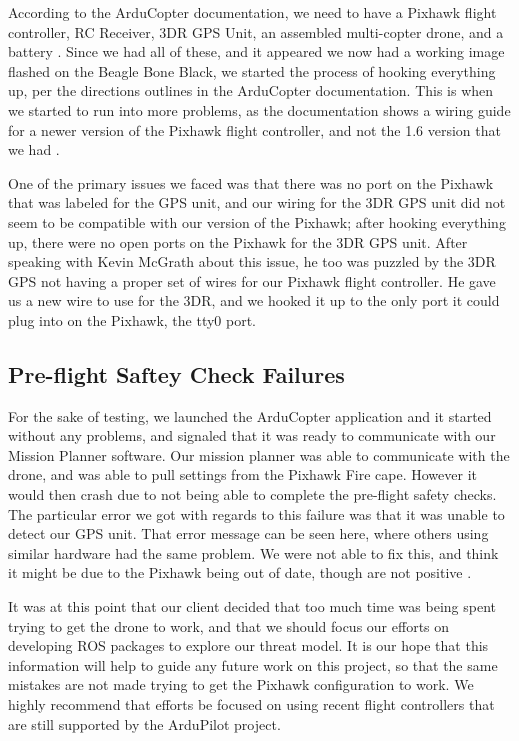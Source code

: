 \documentclass[IEEEtran,letterpaper,10pt,notitlepage,draftclsnofoot]{article}
\begin{document}
According to the ArduCopter documentation, we need to have a Pixhawk flight controller, RC Receiver, 3DR GPS
Unit, an assembled multi-copter drone, and a battery \cite{ArduCopterIntro}.
Since we had all of these, and it appeared we now had a working image flashed on the Beagle Bone Black, we
started the process of hooking everything up, per the directions outlines in
the ArduCopter documentation. This is when we started to run into more problems, as the documentation shows a
wiring guide for a newer version of the Pixhawk flight controller, and not the 1.6 version that we had
\cite{ArduPixhawkWiring}.

One of the primary issues we faced was that there was no port on the Pixhawk that was labeled for the GPS
unit, and our wiring for the 3DR GPS unit did not seem to be compatible with our version of the Pixhawk; after
hooking everything up, there were no open ports on the Pixhawk for the 3DR GPS unit.
After speaking with Kevin McGrath about this issue, he too was puzzled by the 3DR GPS not having a proper
set of wires for our Pixhawk flight controller. He gave us a new wire to use for the 3DR, and we hooked it
up to the only port it could plug into on the Pixhawk, the tty0 port.


\subsection{Pre-flight Saftey Check Failures}

For the sake of testing, we launched the ArduCopter application and it started without any problems, and
signaled that it was ready to communicate with our Mission Planner software. Our mission planner was able to
communicate with the drone, and was able to pull settings from the Pixhawk Fire cape. However it would then
crash due to not being able to complete the pre-flight safety checks. The particular error we got with
regards to this failure was that it was unable to detect our GPS unit. That error message can be seen here,
where others using similar hardware had the same problem. We were not able to fix this, and think it might
be due to the Pixhawk being out of date, though are not positive \cite{3DRError} \cite{3DRError2}. 

It was at this point that our client decided that too much time was being spent trying to get the drone to
work, and that we should focus our efforts on developing ROS packages to explore our threat model. It is our
hope that this information will help to guide any future work on this project, so that the same mistakes are
not made trying to get the Pixhawk configuration to work. We highly recommend that efforts be focused on using
recent flight controllers that are still supported by the ArduPilot project.
\end{document}
